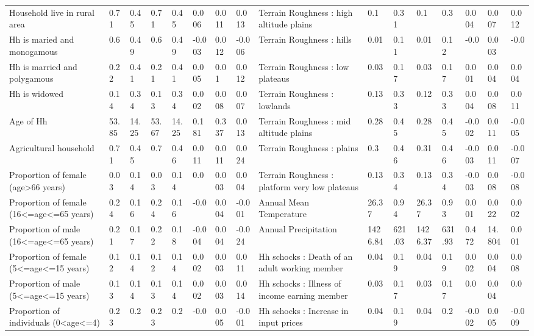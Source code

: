 \begin{table}[H]
{\begin{tabular}{@{}llllllll|llllllll@{}}
Household live in rural area & 0.71 & 0.45 & 0.71 & 0.45 & 0.006 & 0.011 & 0.013 & Terrain Roughness : high altitude plains & 0.1 & 0.31 & 0.1 & 0.3 & 0.004 & 0.007 & 0.012 \\
Hh is maried and monogamous & 0.6 & 0.49 & 0.6 & 0.49 & -0.003 & 0.012 & -0.006 & Terrain Roughness : hills & 0.01 & 0.11 & 0.01 & 0.12 & -0.0 & 0.003 & -0.0 \\
Hh is married and polygamous & 0.22 & 0.41 & 0.21 & 0.41 & 0.005 & 0.01 & 0.012 & Terrain Roughness : low plateaus & 0.03 & 0.17 & 0.03 & 0.17 & 0.001 & 0.004 & 0.004 \\
Hh is widowed & 0.14 & 0.34 & 0.13 & 0.34 & 0.002 & 0.008 & 0.007 & Terrain Roughness : lowlands & 0.13 & 0.33 & 0.12 & 0.33 & 0.004 & 0.008 & 0.011 \\
Age of Hh & 53.85 & 14.25 & 53.67 & 14.25 & 0.181 & 0.337 & 0.013 & Terrain Roughness : mid altitude plains & 0.28 & 0.45 & 0.28 & 0.45 & -0.002 & 0.011 & -0.005 \\
Agricultural household & 0.71 & 0.45 & 0.7 & 0.46 & 0.011 & 0.011 & 0.024 & Terrain Roughness : plains & 0.3 & 0.46 & 0.31 & 0.46 & -0.003 & 0.011 & -0.007 \\
Proportion of female (age\textgreater{}66 years) & 0.03 & 0.14 & 0.03 & 0.14 & 0.0 & 0.003 & 0.004 & Terrain Roughness : platform very low plateaus & 0.13 & 0.34 & 0.13 & 0.34 & -0.003 & 0.008 & -0.008 \\
Proportion of female (16\textless{}=age\textless{}=65 years) & 0.24 & 0.16 & 0.24 & 0.16 & -0.0 & 0.004 & -0.001 & Annual Mean Temperature & 26.37 & 0.94 & 26.37 & 0.93 & 0.001 & 0.022 & 0.002 \\
Proportion of male (16\textless{}=age\textless{}=65 years) & 0.21 & 0.17 & 0.22 & 0.18 & -0.004 & 0.004 & -0.024 & Annual Precipitation & 1426.84 & 621.03 & 1426.37 & 631.93 & 0.472 & 14.804 & 0.001 \\
Proportion of female (5\textless{}=age\textless{}=15 years) & 0.12 & 0.14 & 0.12 & 0.14 & 0.002 & 0.003 & 0.011 & Hh schocks : Death of an adult working member & 0.04 & 0.19 & 0.04 & 0.19 & 0.002 & 0.004 & 0.008 \\
Proportion of male (5\textless{}=age\textless{}=15 years) & 0.13 & 0.14 & 0.13 & 0.14 & 0.002 & 0.003 & 0.014 & Hh schocks : Illness of income earning member & 0.03 & 0.17 & 0.03 & 0.17 & 0.0 & 0.004 & 0.0 \\
Proportion of individuals (0\textless{}age\textless{}=4) & 0.23 & 0.2 & 0.23 & 0.2 & -0.0 & 0.005 & -0.001 & Hh schocks : Increase in input prices & 0.04 & 0.19 & 0.04 & 0.2 & -0.002 & 0.005 & -0.009 \\

\end{tabular}}
\end{table}
